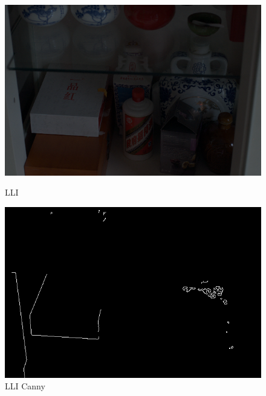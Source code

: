 \documentclass[CJK,aspectratio=169]{beamer}  %
\begin{document}
	\begin{frame}
		\begin{figure}
			\centering
			\setlength{\abovecaptionskip}{-0.05cm} 	
			\begin{minipage}{.19\textwidth}
				\centering
				\includegraphics[width=\linewidth]{picture/LLIE/My Architecture/Edge Detection/low00044}
				\caption*{\tiny LLI}
				\label{fig: LLI}
			\end{minipage}
			\begin{minipage}{.19\textwidth}
				\centering
				\includegraphics[width=\linewidth]{picture/LLIE/My Architecture/Edge Detection/low00044_canny}
				\caption*{\tiny LLI Canny}
				\label{fig: LLI_canny}
			\end{minipage}
			\begin{minipage}{.19\textwidth}
				\centering

\end{minipage}
\end{figure}
\end{frame}
\end{document}
